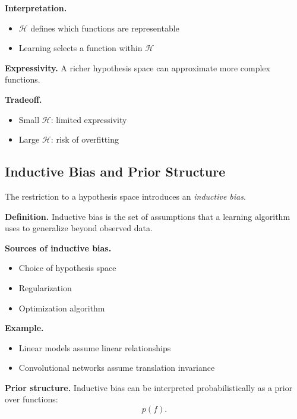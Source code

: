 \medskip

\noindent
\textbf{Interpretation.}
\begin{itemize}
    \item $\mathcal{H}$ defines which functions are representable
    \item Learning selects a function within $\mathcal{H}$
\end{itemize}

\medskip

\noindent
\textbf{Expressivity.}  
A richer hypothesis space can approximate more complex functions.

\medskip

\noindent
\textbf{Tradeoff.}
\begin{itemize}
    \item Small $\mathcal{H}$: limited expressivity
    \item Large $\mathcal{H}$: risk of overfitting
\end{itemize}

\subsection{Inductive Bias and Prior Structure}

The restriction to a hypothesis space introduces an \emph{inductive bias}.

\medskip

\noindent
\textbf{Definition.}  
Inductive bias is the set of assumptions that a learning algorithm uses to generalize beyond observed data.

\medskip

\noindent
\textbf{Sources of inductive bias.}
\begin{itemize}
    \item Choice of hypothesis space
    \item Regularization
    \item Optimization algorithm
\end{itemize}

\medskip

\noindent
\textbf{Example.}
\begin{itemize}
    \item Linear models assume linear relationships
    \item Convolutional networks assume translation invariance
\end{itemize}

\medskip

\noindent
\textbf{Prior structure.}  
Inductive bias can be interpreted probabilistically as a prior over functions:
\[
p(f).
\]

